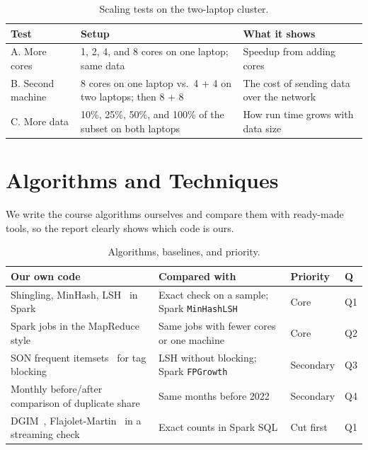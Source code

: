 \documentclass[11pt,a4paper]{article}
\begin{document}
\begin{table}[H]
\centering
\caption{Scaling tests on the two-laptop cluster.}
\label{tab:scale}
\small
\begin{tabularx}{\textwidth}{@{}l Y Y@{}}
\toprule
\textbf{Test} & \textbf{Setup} & \textbf{What it shows} \\
\midrule
A. More cores & 1, 2, 4, and 8 cores on one laptop; same data & Speedup from adding cores \\
B. Second machine & 8 cores on one laptop vs.\ 4 + 4 on two laptops; then 8 + 8 & The cost of sending data over the network \\
C. More data & 10\%, 25\%, 50\%, and 100\% of the subset on both laptops & How run time grows with data size \\
\bottomrule
\end{tabularx}
\end{table}

\section{Algorithms and Techniques}

We write the course algorithms ourselves and compare them with ready-made tools,
so the report clearly shows which code is ours.

\begin{table}[H]
\centering
\caption{Algorithms, baselines, and priority.}
\label{tab:alg}
\small
\begin{tabularx}{\textwidth}{@{}Y Y l l@{}}
\toprule
\textbf{Our own code} & \textbf{Compared with} & \textbf{Priority} & \textbf{Q} \\
\midrule
Shingling, MinHash, LSH~\cite{broder1997,indyk1998} in Spark & Exact check on a sample; Spark \texttt{MinHashLSH} & Core & Q1 \\
Spark jobs in the MapReduce style~\cite{dean2004} & Same jobs with fewer cores or one machine & Core & Q2 \\
SON frequent itemsets~\cite{son1995} for tag blocking & LSH without blocking; Spark \texttt{FPGrowth} & Secondary & Q3 \\
Monthly before/after comparison of duplicate share & Same months before 2022 & Secondary & Q4 \\
DGIM~\cite{dgim2002}, Flajolet-Martin~\cite{fm1985} in a streaming check & Exact counts in Spark SQL & Cut first & Q1 \\
\bottomrule
\end{tabularx}
\end{table}
\end{document}

